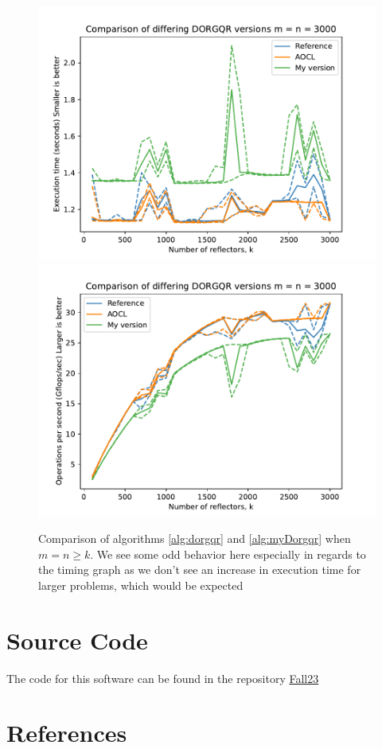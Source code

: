 \documentclass[12pt]{article}
\begin{document}
    \begin{figure}
        \centering
            \includegraphics[width=.45\textwidth]{figures/timeDORGQRSquare.pdf}
            \includegraphics[width=.45\textwidth]{figures/flopDORGQRSquare.pdf}
        \caption{Comparison of algorithms \ref{alg:dorgqr} and \ref{alg:myDorgqr} when $m=n\geq k$. 
        We see some odd behavior here especially in regards to the timing graph as we don't see an increase 
        in execution time for larger problems, which would be expected}\label{fig:dorgqrSquare}
    \end{figure}
    \section{Source Code}
    The code for this software can be found in the repository \href{https://github.com/jprhyne/Fall23}{Fall23}
    \section{References}
    
    
\end{document}
